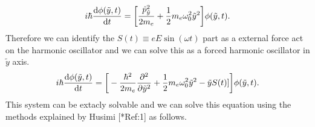 \begin{equation} \label{1.31}
  \begin{aligned}
     i \hbar \dv{\phi(\tilde{y},t)}{t} =
    \bigg[
    \frac{\hat{p}_{\tilde{y}}^2}{2m_e} +
    \frac{1}{2}m_e \omega_0^2\tilde{y}^2
    \bigg]
    \phi(\tilde{y},t).
  \end{aligned}
\end{equation}
Therefore we can identify the $S(t) \equiv eE\sin(\omega t)$ part as a external force act on the harmonic oscillator and we can solve this as a forced harmonic oscillator in $\tilde{y}$ axis.
\begin{equation} \label{1.32}
  \begin{aligned}
    i \hbar \dv{\phi(\tilde{y},t)}{t} =
    \bigg[
    -
    \frac{\hbar^2}{2m_e}
    \pdv[2]{\tilde{y}} +
    \frac{1}{2}m_e \omega_0^2\tilde{y}^2
    - \tilde{y}S(t)]
    \bigg]
    \phi(\tilde{y},t).
  \end{aligned}
\end{equation}
This system can be extacly solvable and we can solve this equation using the methods explained by Husimi [*Ref:1] as follows.

